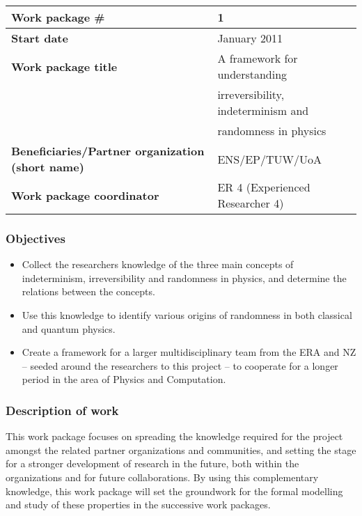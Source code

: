 \documentclass[12pt]{article}
\begin{document}
\begin{center}
{
\begin{tabular}{|l|l|}
\hline
{\bf Work  package \#}&1\\
\hline
{\bf Start date}&January 2011\\
\hline
{\bf Work  package title}&A framework for understanding\\&   irreversibility, indeterminism and \\& randomness in physics\\
\hline
{\bf Beneficiaries/Partner organization (short name)}&ENS/EP/TUW/UoA\\
\hline
{\bf Work  package coordinator}&ER 4 (Experienced Researcher 4)\\
\hline
\end{tabular}
}
\end{center}

\subsubsection*{Objectives}

\begin{itemize}
\item Collect the researchers knowledge of the three main concepts of indeterminism, irreversibility and randomness in physics, and determine the relations between the concepts.
\item Use this knowledge to identify various origins of randomness in both classical and quantum physics.

\item Create a framework for a larger multidisciplinary team from the ERA and NZ -- seeded around the researchers to this project -- to cooperate for a longer period in the area of Physics and Computation.
\end{itemize}

\subsubsection*{Description of work}

This work package focuses on spreading the knowledge required for the project amongst the related partner organizations and communities, and setting the stage for a stronger development of research in the future, both within the organizations and for future collaborations. By using this complementary knowledge, this work package will set the groundwork for the formal modelling and study of these properties in the successive work packages.
\end{document}
